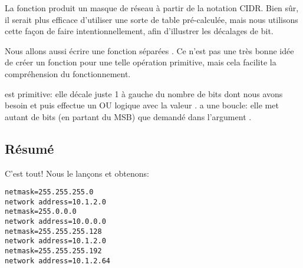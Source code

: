 La fonction  produit un masque de réseau à partir de la notation
\ac{CIDR}.
Bien sûr, il serait plus efficace d'utiliser une sorte de table pré-calculée, mais
nous utilisons cette façon de faire intentionnellement, afin d'illustrer les décalages
de bit.

Nous allons aussi écrire une fonction séparées .
Ce n'est pas une très bonne idée de créer un fonction pour une telle opération primitive,
mais cela facilite la compréhension du fonctionnement.



 est primitive: elle décale juste 1 à gauche du nombre de bits dont
nous avons besoin et puis effectue un OU logique avec la valeur .
 a une boucle: elle met autant de bits (en partant du \ac{MSB})
que demandé dans l'argument .

\subsection{Résumé}

C'est tout!
Nous le lançons et obtenons:

\begin{lstlisting}
netmask=255.255.255.0
network address=10.1.2.0
netmask=255.0.0.0
network address=10.0.0.0
netmask=255.255.255.128
network address=10.1.2.0
netmask=255.255.255.192
network address=10.1.2.64
\end{lstlisting}
